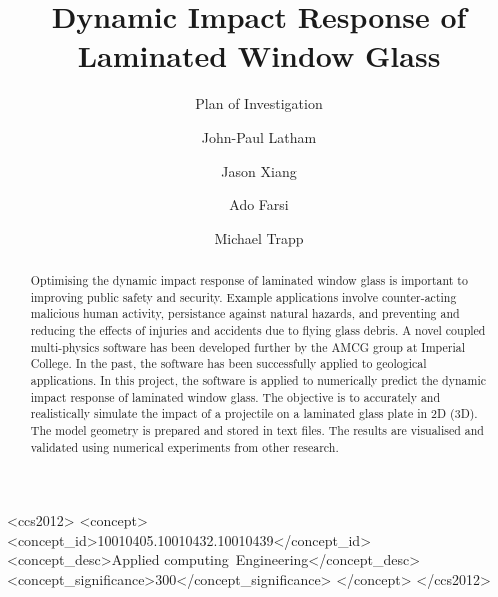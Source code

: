 \documentclass[format=acmtog, 12pt, screen=true, review=false]{acmart}
\title[Dynamic Impact Response of LG]{Dynamic Impact Response of Laminated Window Glass}
\subtitle{Plan of Investigation}
\author{John-Paul Latham}
\author{Jason Xiang}
\author{Ado Farsi}
\author{Michael Trapp}
\begin{document}
\begin{abstract}
  Optimising the dynamic impact response of laminated window glass is important to improving public safety and security. Example applications involve counter-acting malicious human activity, persistance against natural hazards, and preventing and reducing the effects of injuries and accidents due to flying glass debris. A novel coupled multi-physics software has been developed further by the AMCG group at Imperial College. In the past, the software has been successfully applied to geological applications. In this project, the software is applied to numerically predict the dynamic impact response of laminated window glass. The objective is to accurately and realistically simulate the impact of a projectile on a laminated glass plate in 2D (3D). The model geometry is prepared and stored in text files. The results are visualised and validated using numerical experiments from other research.
\end{abstract}

%
%
\begin{CCSXML}
<ccs2012>
<concept>
<concept_id>10010405.10010432.10010439</concept_id>
<concept_desc>Applied computing~Engineering</concept_desc>
<concept_significance>300</concept_significance>
</concept>
</ccs2012>
\end{CCSXML}

\end{document}
